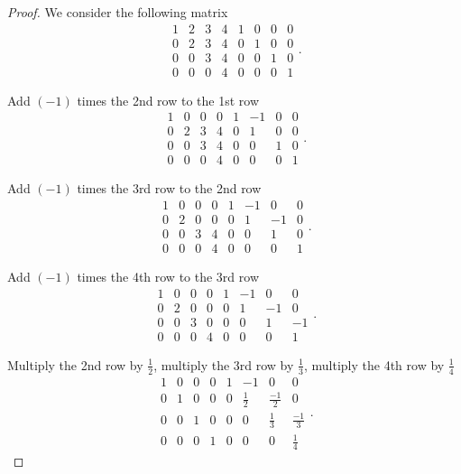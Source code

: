 \begin{proof}
    We consider the following matrix
    \[
        \begin{array}{cccc|cccc}
            1 & 2 & 3 & 4 & 1 & 0 & 0 & 0 \\
            0 & 2 & 3 & 4 & 0 & 1 & 0 & 0 \\
            0 & 0 & 3 & 4 & 0 & 0 & 1 & 0 \\
            0 & 0 & 0 & 4 & 0 & 0 & 0 & 1
        \end{array}.
    \]

    Add $(-1)$ times the 2nd row to the 1st row
    \[
        \begin{array}{cccc|cccc}
            1 & 0 & 0 & 0 & 1 & -1 & 0 & 0 \\
            0 & 2 & 3 & 4 & 0 & 1  & 0 & 0 \\
            0 & 0 & 3 & 4 & 0 & 0  & 1 & 0 \\
            0 & 0 & 0 & 4 & 0 & 0  & 0 & 1
        \end{array}.
    \]

    Add $(-1)$ times the 3rd row to the 2nd row
    \[
        \begin{array}{cccc|cccc}
            1 & 0 & 0 & 0 & 1 & -1 & 0  & 0 \\
            0 & 2 & 0 & 0 & 0 & 1  & -1 & 0 \\
            0 & 0 & 3 & 4 & 0 & 0  & 1  & 0 \\
            0 & 0 & 0 & 4 & 0 & 0  & 0  & 1
        \end{array}.
    \]

    Add $(-1)$ times the 4th row to the 3rd row
    \[
        \begin{array}{cccc|cccc}
            1 & 0 & 0 & 0 & 1 & -1 & 0  & 0  \\
            0 & 2 & 0 & 0 & 0 & 1  & -1 & 0  \\
            0 & 0 & 3 & 0 & 0 & 0  & 1  & -1 \\
            0 & 0 & 0 & 4 & 0 & 0  & 0  & 1
        \end{array}.
    \]

    Multiply the 2nd row by $\frac{1}{2}$, multiply the 3rd row by $\frac{1}{3}$, multiply the 4th row by $\frac{1}{4}$
    \[
        \begin{array}{cccc|cccc}
            1 & 0 & 0 & 0 & 1 & -1          & 0            & 0            \\
            0 & 1 & 0 & 0 & 0 & \frac{1}{2} & \frac{-1}{2} & 0            \\
            0 & 0 & 1 & 0 & 0 & 0           & \frac{1}{3}  & \frac{-1}{3} \\
            0 & 0 & 0 & 1 & 0 & 0           & 0            & \frac{1}{4}
        \end{array}.
    \]


\end{proof}
